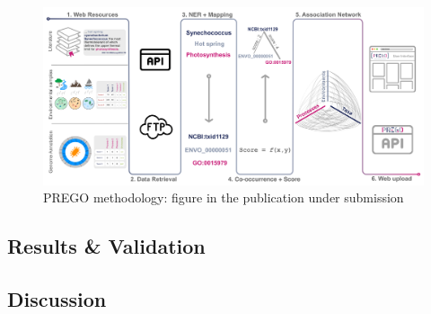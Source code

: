 \begin{figure}[!htbp]
   \centering
   \includegraphics[width=0.98\columnwidth]{figures/prego_analysis_horizontal.png}
   \caption{PREGO methodology: figure in the publication under submission}
\end{figure}

\subsection{Results \& Validation}

\subsection{Discussion}


